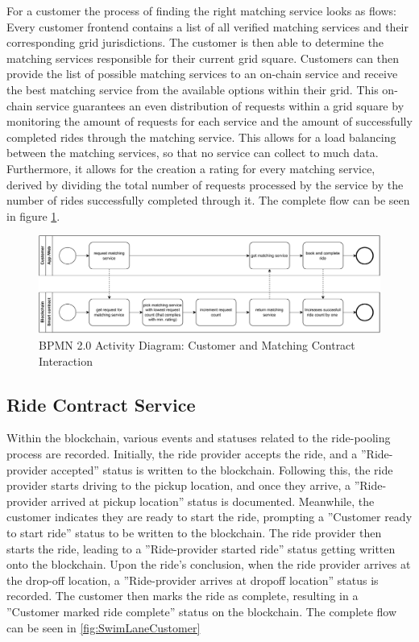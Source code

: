 For a customer the process of finding the right matching service looks as flows: Every customer frontend contains a list of all verified matching services and their corresponding grid jurisdictions. The customer is then able to determine the matching services responsible for their current grid square.  Customers can then provide the list of possible matching services to an on-chain service and receive the best matching service from the available options within their grid. This on-chain service guarantees an even distribution of requests within a grid square by monitoring the amount of requests for each service and the amount of successfully completed rides through the matching service. This allows for a load balancing between the matching services, so that no service can collect to much data. Furthermore, it allows for the creation a rating for every matching service, derived by dividing the total number of requests processed by the service by the number of rides successfully completed through it. The complete flow can be seen in figure \ref{fig:getBestMatchingService}.

\begin{figure}[h]
    \centering
    \includegraphics[width=\linewidth]{data/4.svg}
    \caption{BPMN 2.0 Activity Diagram: Customer and Matching Contract Interaction}
    \label{fig:getBestMatchingService}
\end{figure}


\subsection{Ride Contract Service}\label{subsec:RideContractService}

Within the blockchain, various events and statuses related to the ride-pooling process are recorded. Initially, the ride provider accepts the ride, and a ''Ride-provider accepted'' status is written to the blockchain. Following this, the ride provider starts driving to the pickup location, and once they arrive, a ''Ride-provider arrived at pickup location'' status is documented. Meanwhile, the customer indicates they are ready to start the ride, prompting a ''Customer ready to start ride'' status to be written to the blockchain. The ride provider then starts the ride, leading to a ''Ride-provider started ride'' status getting written onto the blockchain. Upon the ride's conclusion, when the ride provider arrives at the drop-off location, a ''Ride-provider arrives at dropoff location'' status is recorded. The customer then marks the ride as complete, resulting in a ''Customer marked ride complete'' status on the blockchain. The complete flow can be seen in \ref{fig:SwimLaneCustomer}

